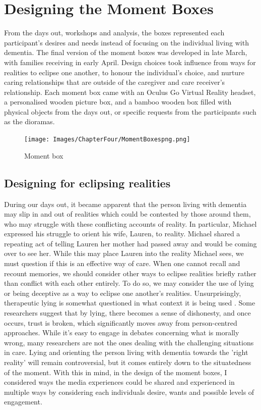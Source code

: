 \section{Designing the Moment Boxes}
\label{Relationships:MomentBoxes}
From the days out, workshops and analysis, the boxes represented each participant's desires and needs instead of focusing on the individual living with dementia. The final version of the moment boxes was developed in late March, with families receiving in early April. Design choices took influence from ways for realities to eclipse one another, to honour the individual's choice, and nurture caring relationships that are outside of the caregiver and care receiver's relationship. Each moment box came with an Oculus Go Virtual Reality headset, a personalised wooden picture box, and a bamboo wooden box filled with physical objects from the days out, or specific requests from the participants such as the dioramas.
 
\begin{figure}
\centering
\texttt{[image: Images/ChapterFour/MomentBoxespng.png]}
\caption{Moment box}
\label{fig:MomentBoxes}
\end{figure}

 
\subsection{Designing for eclipsing realities}
\label{momentBoxes:realities}
During our days out, it became apparent that the person living with dementia may slip in and out of realities which could be contested by those around them, who may struggle with these conflicting accounts of reality. In particular, Michael expressed his struggle to orient his wife, Lauren, to reality. Michael shared a repeating act of telling Lauren her mother had passed away and would be coming over to see her. While this may place Lauren into the reality Michael sees, we must question if this is an effective way of care. When one cannot recall and recount memories, we should consider other ways to eclipse realities briefly rather than conflict with each other entirely. To do so, we may consider the use of lying or being deceptive as a way to eclipse one another's realities. Unsurprisingly, therapeutic lying is somewhat questioned in what context it is being used \citep{elvish_lying_2010, lorey_fake_2019}. Some researchers suggest that by lying, there becomes a sense of dishonesty, and once occurs, trust is broken, which significantly moves away from person-centred approaches. While it's easy to engage in debates concerning what is morally wrong, many researchers are not the ones dealing with the challenging situations in care. Lying and orienting the person living with dementia towards the 'right reality' will remain controversial, but it comes entirely down to the situatedness of the moment. With this in mind, in the design of the moment boxes, I considered ways the media experiences could be shared and experienced in multiple ways by considering each individuals desire, wants and possible levels of engagement.
 
